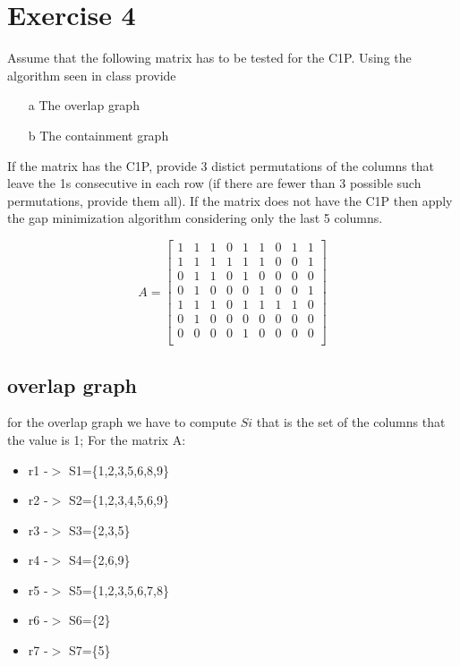 \documentclass[]{article}
\begin{document}
\section{Exercise 4}

Assume that the following matrix has to be tested for the C1P. Using the algorithm seen in class provide
\begin{enumerate}

\item[a] The overlap graph
\item[b] The containment graph

\end{enumerate}

If the matrix has the C1P, provide 3 distict permutations of the columns that leave the 1s consecutive
in each row (if there are fewer than 3 possible such permutations, provide them all). If the matrix does not have the C1P then apply the gap minimization algorithm considering only the last 5 columns.


\[A=\begin{bmatrix}
1 & 1 & 1 & 0 & 1 & 1 & 0 & 1 & 1 \\
1 & 1 & 1 & 1 & 1 & 1 & 0 & 0 & 1 \\
0 & 1 & 1 & 0 & 1 & 0 & 0 & 0 & 0 \\
0 & 1 & 0 & 0 & 0 & 1 & 0 & 0 & 1 \\
1 & 1 & 1 & 0 & 1 & 1 & 1 & 1 & 0 \\
0 & 1 & 0 & 0 & 0 & 0 & 0 & 0 & 0 \\
0 & 0 & 0 & 0 & 1 & 0 & 0 & 0 & 0 \\
\end{bmatrix}\]


\subsection{overlap graph}

for the overlap graph we have to compute $Si$ that is the set of the columns that the value is 1;
For the matrix A:

\begin{itemize}

\item r1 -$>$ S1=\{1,2,3,5,6,8,9\}
\item r2 -$>$ S2=\{1,2,3,4,5,6,9\}
\item r3 -$>$ S3=\{2,3,5\}
\item r4 -$>$ S4=\{2,6,9\}
\item r5 -$>$ S5=\{1,2,3,5,6,7,8\}
\item r6 -$>$ S6=\{2\}
\item r7 -$>$ S7=\{5\}

\end{itemize}
\end{document}

